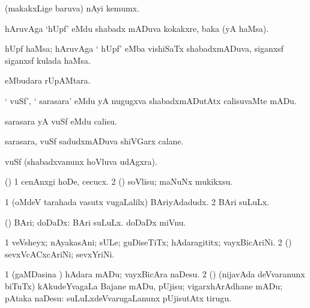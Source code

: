 \bentry
{}
\gl{\nA}
\bmng
(makakxLige baruva) nAyi kemumx. 
\emng
\eentry

\bentry
{}
\gl{\nA}
\bmng
hAruvAga `hUpf' eMdu shabadx mADuva kokakxre, baka (yA haMsa). 
\emng
\eentry

\bentry
{}
\gl{\nA}
\bmng
hUpf haMsa; hAruvAga ` hUpf' eMba vishiSaTx shabadxmADuva, siganxsf siganxsf kulada haMsa. 
\emng
\eentry

\bentry
{}
\gl{\BAavayx}
\bmng
{} eMbudara rUpAMtara. 
\emng
\eentry

\bentry
{} 
\gl{\sakirx}
\expl{}
\bmng
` vuSf', ` sarasara' eMdu yA nugugxva shabadxmADutAtx calisuvaMte mADu. 
\emng

\noindent
\gl{\akirx}
\bmng
sarasara yA vuSf eMdu calisu. 
\emng
\eentry

\bentry
{} 
\gl{\nA}
\bmng
sarasara, vuSf sadudxmADuva shiVGarx calane. 
\emng
\eentry

\bentry
{} 
\gl{\BAavayx}
\bmng
vuSf (shabadxvanunx hoVluva udAgxra). 
\emng
\eentry

\bentry
{} 
\gl{\sakirx}
\bmng
(\ashi) 
\bnum
\num{1} cenAnxgi hoDe, cecucx. 
\num{2} (\rUpa) soVlisu; maNuNx mukikxsu. 
\enum
\emng
\eentry

\bentry 
{}
\gl{\nA}
\bmng
\bnum
\num{1} (oMdeV tarahada vasutx \mo vugaLalilx) BAriyAdadudx. 
\num{2} BAri suLuLx. 
\enum
\emng
\eentry

\bentry
{}
\gl{\gu}
\bmng
(\ashi) BAri; doDaDx:  BAri suLuLx.  doDaDx miVnu. 
\emng
\eentry

\bentry
{} 
\gl{\nA}
\bmng
\bnum
\num{1} veVsheyx; nAyakasAni; sULe; guDiseTiTx; hAdaragititx; vayxBicAriNi. 
\num{2} (\hiV) sevxVcACxcAriNi; sevxYriNi. 
\enum
\emng
\eentry

\bentry
{} 
\gl{\akirx}
\bmng
\bnum
\num{1} (gaMDasina \vi) hAdara mADu; vayxBicAra naDesu. 
\num{2} (\pArxparx) (nijavAda deVvaranunx biTuTx) kAkudeYvagaLa Bajane mADu, pUjisu; vigarxhArAdhane mADu; pAtaka naDesu:  suLuLxdeVvarugaLanunx pUjisutAtx tirugu. 
\enum
\emng
\eentry


